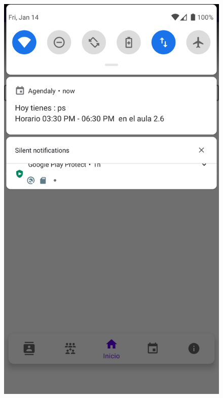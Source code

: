 \documentclass[a4paper,openright,12pt]{article}
\begin{document}
\begin{figure}
        \includegraphics[scale=0.05]{notificacion8.png}

\end{figure}
\end{document}

